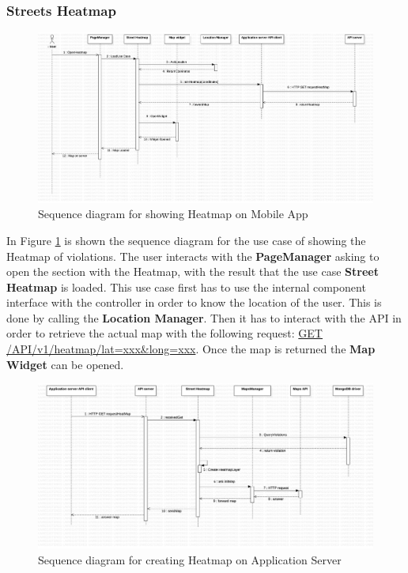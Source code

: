 \subsubsection{Streets Heatmap}%
\begin{figure}[H]
\centering
\includegraphics[width=\textwidth]{Images/DDSeqAppMap.png}
\caption{\label{fig:DDSeqAppMap} Sequence diagram for showing Heatmap on Mobile App}
\end{figure}

In Figure \ref{fig:DDSeqAppMap} is shown the sequence diagram for the use case of showing the Heatmap of violations.
The user interacts with the \textbf{PageManager} asking to open the section with the Heatmap, with the result that the use case \textbf{Street Heatmap} is loaded. This use case first has to use the internal component interface with the controller in order to know the location of the user. This is done by calling the \textbf{Location Manager}. Then it has to interact with the API in order to retrieve the actual map with the following request: \url{GET} \url{/API/v1/heatmap/lat=xxx&long=xxx}.
Once the map is returned the \textbf{Map Widget} can be opened.

\begin{figure}[H]
\centering
\includegraphics[width=\textwidth]{Images/DDSeqSeverMap.png}
\caption{\label{fig:DDSeqSeverMap} Sequence diagram for creating Heatmap on Application Server}
\end{figure}

